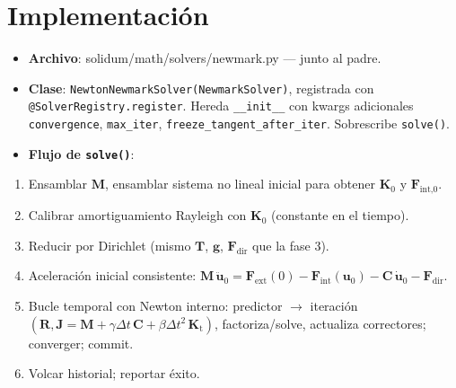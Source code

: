 \documentclass[11pt,letterpaper,oneside]{report}
\begin{document}
\section{Implementación}

\begin{itemize}
  \item \textbf{Archivo}: solidum/math/solvers/newmark.py --- junto al padre.
  \item \textbf{Clase}: \texttt{NewtonNewmarkSolver(NewmarkSolver)}, registrada con \texttt{@SolverRegistry.register}. Hereda \texttt{\_\_init\_\_} con kwargs adicionales \texttt{convergence}, \texttt{max\_iter}, \texttt{freeze\_tangent\_after\_iter}. Sobrescribe \texttt{solve()}.
  \item \textbf{Flujo de \texttt{solve()}}:
\end{itemize}
\begin{enumerate}
  \item Ensamblar $\mathbf M$, ensamblar sistema no lineal inicial para obtener $\mathbf K_0$ y $\mathbf F_\text{int,0}$.
  \item Calibrar amortiguamiento Rayleigh con $\mathbf K_0$ (constante en el tiempo).
  \item Reducir por Dirichlet (mismo $\mathbf T$, $\mathbf g$, $\mathbf F_\text{dir}$ que la fase 3).
  \item Aceleración inicial consistente: $\mathbf M\,\ddot{\mathbf u}_0 = \mathbf F_\text{ext}(0) - \mathbf F_\text{int}(\mathbf u_0) - \mathbf C\,\dot{\mathbf u}_0 - \mathbf F_\text{dir}$.
  \item Bucle temporal con Newton interno: predictor \ensuremath{\to} iteración $(\mathbf R, \mathbf J = \mathbf M + \gamma\Delta t\,\mathbf C + \beta\Delta t^2\,\mathbf K_\text{t})$, factoriza/solve, actualiza correctores; converger; commit.
  \item Volcar historial; reportar éxito.
\end{enumerate}
\end{document}
